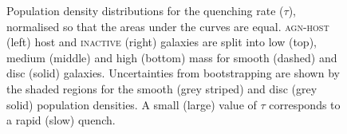 \begin{figure}
\caption[Quenching rate population density distributions for the \textsc{agn-host} and \textsc{inactive} samples]{Population density distributions for the quenching rate ($\tau$), normalised so that the areas under the curves are equal. \textsc{agn-host} (left) host and \textsc{inactive} (right) galaxies are split into low (top), medium (middle) and high (bottom) mass for smooth (dashed) and disc (solid) galaxies. Uncertainties from bootstrapping are shown by the shaded regions for the smooth (grey striped) and disc (grey solid) population densities. A small (large) value of $\tau$ corresponds to a rapid (slow) quench.}
\label{rate}
\end{figure}

